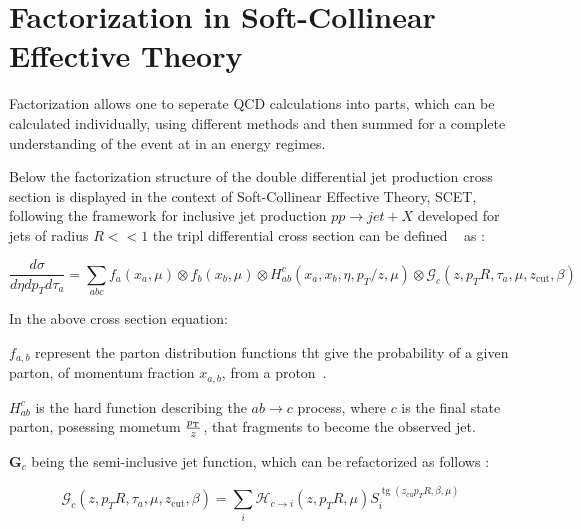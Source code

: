 

\section{Factorization in Soft-Collinear Effective Theory}\label{sec:SCET}

Factorization allows one to seperate QCD calculations into parts, which can be calculated individually, using different methods and then summed for a complete understanding of the event at in an energy regimes.


Below the factorization structure of the double differential jet production cross section is displayed in the context of Soft-Collinear Effective Theory, SCET, following the framework for inclusive jet production $pp \rightarrow jet + X$ developed for jets of radius $R <<1$ the tripl differential cross section can be defined ~\cite{Kang:2018vgn} as :



\begin{equation}
\frac{d \sigma}{d \eta d p_{T} d \tau_{a}}=\sum_{a b c} f_{a}\left(x_{a}, \mu\right) \otimes f_{b}\left(x_{b}, \mu\right) \otimes H_{a b}^{c}\left(x_{a}, x_{b}, \eta, p_{T} / z, \mu\right) \otimes \mathcal{G}_{c}\left(z, p_{T} R, \tau_{a}, \mu, z_{\mathrm{cut}}, \beta\right)
\end{equation}


In the above cross section equation: \newline

$f_{a, b}$ represent the parton distribution functions tht give the probability of a given parton, of momentum fraction $x_{a,b}$, from a proton~\cite{Kang:2018vgn}.\newline

$H_{a b}^{c}$ is the hard function describing the $a b \rightarrow c$ process, where $c$ is the final state parton, posessing mometum $\frac{p_{\mathrm{T}}}{z}$, that fragments to become the observed jet. 


 $\boldsymbol{G}_{c}$ being the semi-inclusive jet function, which can be refactorized as follows :


\begin{equation}
\mathcal{G}_{c}\left(z, p_{T} R, \tau_{a}, \mu, z_{\mathrm{cut}}, \beta\right)=\sum_{i} \mathcal{H}_{c \rightarrow i}\left(z, p_{T} R, \mu\right) S_{i}^{\operatorname{tg}\left(z_{\mathrm{cu}} p_{T} R, \beta, \mu\right)}
\end{equation}


